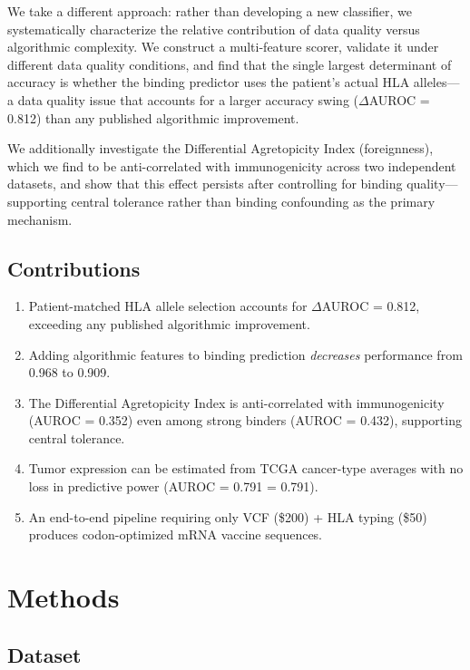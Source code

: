 \documentclass[11pt,twocolumn]{article}
\begin{document}
We take a different approach: rather than developing a new classifier, we systematically characterize the relative contribution of data quality versus algorithmic complexity. We construct a multi-feature scorer, validate it under different data quality conditions, and find that the single largest determinant of accuracy is whether the binding predictor uses the patient's actual HLA alleles---a data quality issue that accounts for a larger accuracy swing ($\Delta$AUROC = 0.812) than any published algorithmic improvement.

We additionally investigate the Differential Agretopicity Index (foreignness), which we find to be anti-correlated with immunogenicity across two independent datasets, and show that this effect persists after controlling for binding quality---supporting central tolerance rather than binding confounding as the primary mechanism.

\subsection{Contributions}

\begin{enumerate}[leftmargin=*,topsep=0pt,itemsep=2pt]
\item Patient-matched HLA allele selection accounts for $\Delta$AUROC = 0.812, exceeding any published algorithmic improvement.
\item Adding algorithmic features to binding prediction \textit{decreases} performance from 0.968 to 0.909.
\item The Differential Agretopicity Index is anti-correlated with immunogenicity (AUROC = 0.352) even among strong binders (AUROC = 0.432), supporting central tolerance.
\item Tumor expression can be estimated from TCGA cancer-type averages with no loss in predictive power (AUROC = 0.791 = 0.791).
\item An end-to-end pipeline requiring only VCF (\$200) + HLA typing (\$50) produces codon-optimized mRNA vaccine sequences.
\end{enumerate}

\section{Methods}

\subsection{Dataset}
\end{document}
